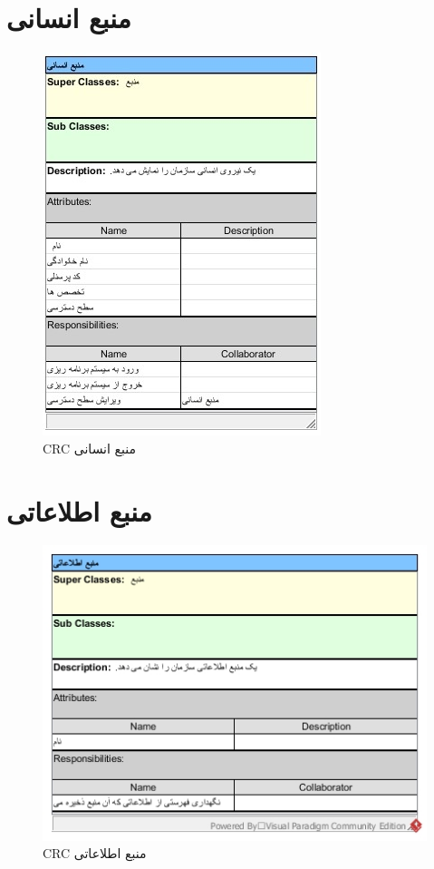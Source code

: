 \section{منبع انسانی}
\begin{figure}[H]
	\centering
	\includegraphics[scale=1]{img/crc/HumanResource}
	\caption{CRC منبع انسانی }
\end{figure}

\section{منبع اطلاعاتی}
\begin{figure}[H]
	\centering
	\includegraphics[scale=0.8]{img/crc/InformationResource}
	\caption{CRC منبع اطلاعاتی }
\end{figure}


